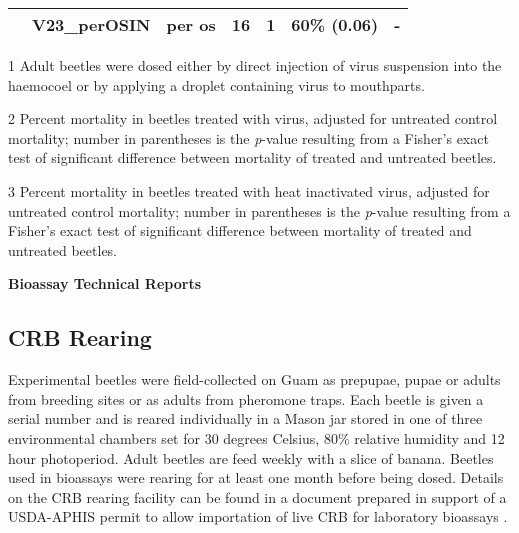 \documentclass[12pt,letterpaper,english,bibliography=totocnumbered]{scrartcl}
\begin{document}
\begin{refsection}
\begin{table}[h]
\begin{adjustbox}{width=\columnwidth,center}
\begin{threeparttable}
\begin{tabular}{ l l l c c c c }
		                      & V23\_perOSIN\cite{moore_bioassay_2019-1}        & per os          & 16      & 1          & 60\% (0.06)                     & -                               \\ \bottomrule
	\end{tabular}
	\begin{tablenotes}[para]
		\item[1] Adult beetles were dosed either by direct injection of virus suspension into the haemocoel or by applying a droplet containing virus to mouthparts. \\ 
		\item[2] Percent mortality in beetles treated with virus, adjusted for untreated control mortality; 
		number in parentheses is the \textit{p}-value resulting from a Fisher's exact test of significant difference between mortality of treated and untreated beetles. \\
		\item[3] Percent mortality in beetles treated with heat inactivated virus, adjusted for untreated control mortality; 
		number in parentheses is the \textit{p}-value resulting from a Fisher's exact test of significant difference between mortality of treated and untreated beetles. 
	\end{tablenotes}
	 		
\end{threeparttable}
	\end{adjustbox}
\end{table}
\clearpage

\textbf{Bioassay Technical Reports}

\printbibliography[heading=none]
\end{refsection}

\clearpage
\subsection{CRB Rearing}

Experimental beetles were field-collected on Guam as prepupae, pupae or adults from breeding sites or as adults from pheromone traps.  Each beetle is given a serial number and is reared individually in a Mason jar stored in one of three environmental chambers set for 30 degrees Celsius, 80\% relative humidity and 12 hour photoperiod. Adult beetles are feed weekly with a slice of banana. Beetles used in bioassays were rearing for at least one month before being dosed. Details on the CRB rearing facility can be found in a document prepared in support of a USDA-APHIS permit to allow importation of live CRB for laboratory bioassays \cite{moore_additional_2019}.  
\end{document}
